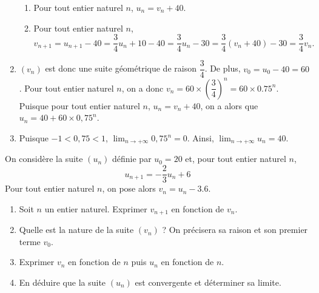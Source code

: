 \documentclass[11pt,fleqn, openany]{book} %
\begin{document}
\begin{solution}
\begin{enumerate}
\begin{enumerate}
\item Pour tout entier naturel $n$, $u_n=v_n+40$. 
\item Pour tout entier naturel $n$, \[v_{n+1} = u_{n+1}-40=\dfrac{3}{4}u_n+10-40=\dfrac{3}{4}u_n-30 = \dfrac{3}{4}(v_n+40)-30=\dfrac{3}{4}v_n.\]\end{enumerate}

\item $(v_n)$ est donc une suite géométrique de raison $\dfrac{3}{4}$. De plus, $v_0=u_0-40=60$. Pour tout entier naturel $n$, on a donc $v_n= 60 \times \left( \dfrac{3}{4}\right)^n=60\times 0.75^n$. Puisque pour tout entier naturel $n$, $u_n=v_n+40$, on a alors que $u_n=40+60 \times 0,75^n$.

\item Puisque $-1<0,75<1$, $\displaystyle \lim_{n\to + \infty} 0,75^n=0$. Ainsi, $\displaystyle \lim_{n\to + \infty} u_n = 40$.\end{enumerate}\end{solution}





\begin{exercise}[topic=lim14, subtitle={(Suite arithmético-géométrique : moins guidé...)}]

On considère la suite $(u_n)$ définie par $u_0=20$ et, pour tout entier naturel $n$, \[u_{n+1}=-\dfrac{2}{3}u_n+6\] Pour tout entier naturel $n$, on pose alors $v_n=u_n-3.6$.

\begin{enumerate}
\item Soit $n$ un entier naturel. Exprimer $v_{n+1}$ en fonction de $v_n$.
\item Quelle est la nature de la suite $(v_n)$ ? On précisera sa raison et son premier terme $v_0$.
\item Exprimer $v_n$ en fonction de $n$ puis $u_n$ en fonction de $n$.
\item En déduire que la suite $(u_n)$ est convergente et déterminer sa limite.
\end{enumerate}\end{exercise}
\end{document}
